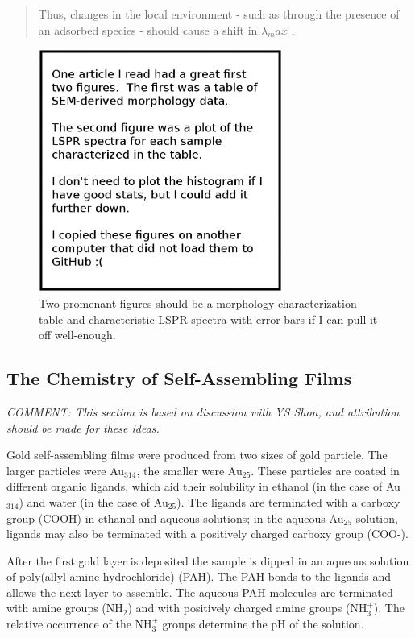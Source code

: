 \documentclass[12pt,oneside,english]{article}
\begin{document}
\begin{quote}
Thus, changes in the local environment - such as through the presence of an adsorbed species - should cause a shift in $\lambda_max$ .
\cite{willets2006}
\end{quote}

	\begin{figure}
		\includegraphics[width=80mm]{images/placeholder.eps}
		\caption{Two promenant figures should be a morphology characterization table and characteristic LSPR spectra with error bars if I can pull it off well-enough.}
	\end{figure}


	\subsection{The Chemistry of Self-Assembling Films}

	\emph{COMMENT: This section is based on discussion with YS Shon, and attribution should be made for these ideas.}
	
	Gold self-assembling films were produced from two sizes of gold particle.  
	The larger particles were Au$_{314}$, the smaller were Au$_{25}$.  
	These particles are coated in different organic ligands, which aid their solubility in ethanol (in the case of Au$_{314}$) and water (in the case of Au$_{25}$).    
	The ligands are terminated with a carboxy group (COOH) in ethanol and aqueous solutions; in the aqueous Au$_{25}$ solution, ligands may also be terminated with a positively charged carboxy group (COO-). 
	
	After the first gold layer is deposited the sample is dipped in an aqueous solution of poly(allyl-amine hydrochloride) (PAH).  
	The PAH bonds to the ligands and allows the next layer to assemble.  	
	The aqueous PAH molecules are terminated with amine groups (NH$_2$) and with positively charged amine groups (NH$_3^+$).  
	The relative occurrence of the NH$_3^+$ groups determine the pH of the solution.
	
\end{document}
